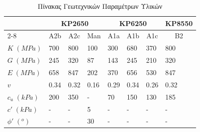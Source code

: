 \begin{table}[ht]
	\centering
	\begin{tabular}{|l|lll|lll|l|}
		\hline
		& \multicolumn{3}{c|}{KP2650}                                                    & \multicolumn{3}{c|}{KP6250}                                                    & \multicolumn{1}{c|}{KP8550} \\ \cline{2-8} 
		& \multicolumn{1}{c|}{A2b} & \multicolumn{1}{c|}{A2c} & \multicolumn{1}{c|}{Man} & \multicolumn{1}{c|}{A1a} & \multicolumn{1}{c|}{A1b} & \multicolumn{1}{c|}{A1c} & \multicolumn{1}{c|}{B2}     \\ \hline
		$K\; (MPa)$    & \multicolumn{1}{l|}{700} & \multicolumn{1}{l|}{800} & 100                       & \multicolumn{1}{l|}{300} & \multicolumn{1}{l|}{680} & 370                      & 800                         \\ \hline
		$G \; (MPa)$   & \multicolumn{1}{l|}{245} & \multicolumn{1}{l|}{320} & 87                       & \multicolumn{1}{l|}{143} & \multicolumn{1}{l|}{245} & 210                      & 320                         \\ \hline
		$E \; (MPa)$   & \multicolumn{1}{l|}{658} & \multicolumn{1}{l|}{847} & 202                       & \multicolumn{1}{l|}{370} & \multicolumn{1}{l|}{656} &  530                &   847                       \\ \hline
		$v$   & \multicolumn{1}{l|}{0.34} & \multicolumn{1}{l|}{0.32} & 0.16                       & \multicolumn{1}{l|}{0.29} & \multicolumn{1}{l|}{0.34} & 0.26                      & 0.32                         \\ \hline
		$c_u\; (kPa)$  & \multicolumn{1}{l|}{200} & \multicolumn{1}{l|}{350} & -                        & \multicolumn{1}{l|}{70}  & \multicolumn{1}{l|}{150} & 130                      & 185                         \\ \hline
		$c'\; (kPa)$   & \multicolumn{1}{l|}{-}   & \multicolumn{1}{l|}{-}   & 5                        & \multicolumn{1}{l|}{-}   & \multicolumn{1}{l|}{-}   & -                        & -                           \\ \hline
		$\phi'\; (^o)$ & \multicolumn{1}{l|}{-}   & \multicolumn{1}{l|}{-}   & 30                       & \multicolumn{1}{l|}{-}   & \multicolumn{1}{l|}{-}   & -                        & -                           \\ \hline
	\end{tabular}
	\caption{Πίνακας Γεωτεχνικών Παραμέτρων Υλικών}
	\label{tab:materials}
\end{table}

